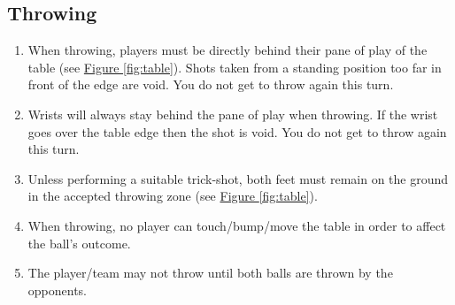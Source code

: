 	\subsection{Throwing}\label{ssec:Throwing}
        \begin{enumerate}[label=(\roman*), ref=\roman*]
            \item \label{sssec:Throwing,stand_behind} When throwing, players must be directly behind their pane of play of the table (see \hyperref[fig:table]{Figure \ref*{fig:table}}).
                Shots taken from a standing position too far in front of the edge are void. You do not get to throw again this turn. 
            \item \label{sssec:Throwing,wrists} Wrists will always stay behind the pane of play when throwing.
                If the wrist goes over the table edge then the shot is void. You do not get to throw again this turn. 
            \item \label{sssec:Throwing,feet} Unless performing a suitable trick-shot, both feet must remain on the ground in the accepted throwing zone (see \hyperref[fig:table]{Figure \ref*{fig:table}}). 
            \item \label{sssec:Throwing,bumping_table} When throwing, no player can touch/bump/move the table in order to affect the ball's outcome. 
            \item \label{sssec:Throwing,possesion} The player/team may not throw until both balls are thrown by the opponents. 
        \end{enumerate}
